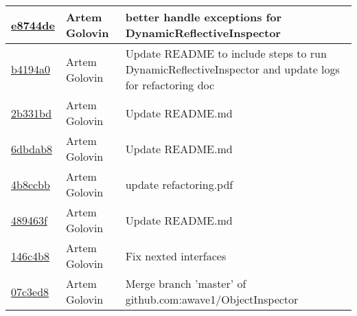 \begin{tabularx}{\textwidth}{l l X}
\href{https://github.com/awave1/ObjectInspector/commit/e8744de8105b6dff68749c4eb2c155bf2f6bf3c6}{e8744de} & Artem Golovin & better handle exceptions for DynamicReflectiveInspector\\ \hline
\href{https://github.com/awave1/ObjectInspector/commit/b4194a0b5da09a00e2497c58d94fee95fa9e428d}{b4194a0} & Artem Golovin & Update README to include steps to run DynamicReflectiveInspector and update logs for refactoring doc\\ \hline
\href{https://github.com/awave1/ObjectInspector/commit/2b331bd1a8e449e6bb33e80e3aa925c59f7f3439}{2b331bd} & Artem Golovin & Update README.md\\ \hline
\href{https://github.com/awave1/ObjectInspector/commit/6dbdab8f21b66d4034da1cadc2f19dc978e5616f}{6dbdab8} & Artem Golovin & Update README.md\\ \hline
\href{https://github.com/awave1/ObjectInspector/commit/4b8ccbb678a9258900fc1fe66e43cedc777c1066}{4b8ccbb} & Artem Golovin & update refactoring.pdf\\ \hline
\href{https://github.com/awave1/ObjectInspector/commit/489463fa7241ac729d600f2a1f0ad9f79fb17bb5}{489463f} & Artem Golovin & Update README.md\\ \hline
\href{https://github.com/awave1/ObjectInspector/commit/146c4b8e547a857d8c47f7637e463e82ca6fcf64}{146c4b8} & Artem Golovin & Fix nexted interfaces\\ \hline
\href{https://github.com/awave1/ObjectInspector/commit/07c3ed821baeec5671e1f86316351f26d4bc25e0}{07c3ed8} & Artem Golovin & Merge branch 'master' of github.com:awave1/ObjectInspector\\ \hline
\end{tabularx}
